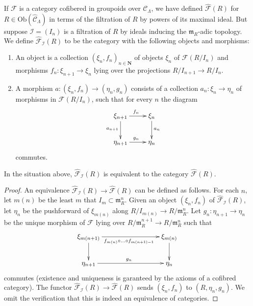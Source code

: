\noindent
If $\mathcal{F}$ is a category cofibered in groupoids over $\mathcal 
C_\Lambda$, we have defined $\widehat{\mathcal{F}}(R)$ for $R \in 
\text{Ob}(\widehat{\mathcal{C}}_\Lambda)$ in terms of the filtration of 
$R$ by powers of its maximal ideal.  But suppose $\mathcal{I} = (I_{n})$ is a 
filtration of $R$ by ideals inducing the $\mathfrak{m}_{R}$-adic topology.  We 
define $\widehat{\mathcal{F}}_{\mathcal{I}}(R)$ to be the category with the 
following objects and morphisms:
\begin{enumerate}
\item An object is a collection $(\xi_n, f_n)_{n \in \mathbf{N}}$ of 
objects $\xi_n$ of $\mathcal{F}(R/I_n)$ and morphisms
$f_n : \xi_{n + 1} \to \xi_n$ lying over the projections
$R/I_{n + 1} \to R/I_n$.
\item A morphism $a: (\xi_n, f_n) \to (\eta_n, g_n)$ consists of a 
collection $a_n : \xi_n \to \eta_n$ of morphisms in
$\mathcal{F}(R/I_n)$, such that for every $n$ the diagram
$$
\xymatrix{
\xi_{n + 1} \ar[r]^{f_n} \ar[d]_{a_{n + 1}} & \xi_n \ar[d]^{a_n} \\
\eta_{n + 1} \ar[r]^{g_n} & \eta_n
}
$$
commutes.
\end{enumerate}

\begin{lemma}
\label{lemma-formal-objects-different-filtration}
In the situation above, $\widehat{\mathcal{F}}_{\mathcal{I}}(R)$ is equivalent
to the category $\widehat{\mathcal{F}}(R)$.
\end{lemma}

\begin{proof}
An equivalence
$\widehat{\mathcal{F}}_{\mathcal{I}}(R) \to \widehat{\mathcal{F}}(R)$
can be defined as follows.  For each $n$, let $m(n)$ be the least $m$
that $I_m \subset \mathfrak m_R^n$.  Given an object 
$(\xi_n, f_n)$ of $\widehat{\mathcal{F}}_{\mathcal{I}}(R)$, let
$\eta_n$ be the pushforward of $\xi_{m(n)}$ along
$R/I_{m(n)} \to R/\mathfrak m_R^n$. Let $g_n : \eta_{n + 1} \to \eta_n$
be the unique morphism of $\mathcal{F}$ lying over
$R/\mathfrak m_R^{n + 1} \to R/\mathfrak m_R^n$ such that
$$
\xymatrix{
\xi_{m(n + 1)} \ar[rrr]_{f_{m(n)} \circ \ldots \circ f_{m(n + 1) - 1}} \ar[d]
& & & \xi_{m(n)} \ar[d] \\
\eta_{n + 1} \ar[rrr]^{g_n} & & & \eta_n
}
$$
commutes (existence and uniqueness is garanteed by the axioms of a
cofibred category). The functor
$\widehat{\mathcal{F}}_{\mathcal{I}}(R) \to \widehat{\mathcal{F}}(R)$
sends $(\xi_n, f_n)$ to $(R, \eta_n, g_n)$. We omit the 
verification that this is indeed an equivalence of categories.
\end{proof}

